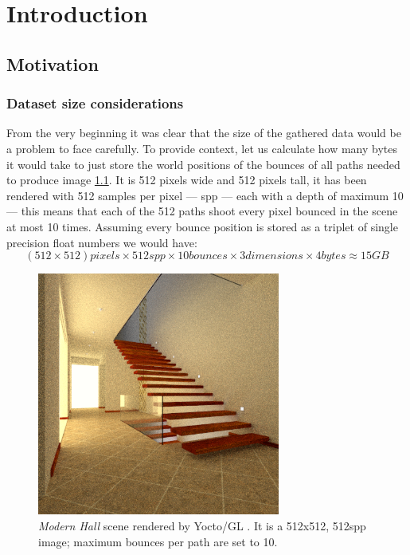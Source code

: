 \chapter{Introduction}

\section{Motivation}
\subsection{Dataset size considerations}
\label{size_considerations}
From the very beginning it was clear that the size of the gathered data would be a problem to face carefully. To provide context, let us calculate how many bytes it would take to just store the world positions of the bounces of all paths needed to produce image \ref{hall_render}. It is 512 pixels wide and 512 pixels tall, it has been rendered with 512 samples per pixel --- spp --- each with a depth of maximum 10 --- this means that each of the 512 paths shoot every pixel bounced in the scene at most 10 times. Assuming every bounce position is stored as a triplet of single precision float numbers we would have:
\begin{equation}
	\label{rough_bounce_size_estimation}
	(512 \times 512) pixels \times 512 spp \times 10 bounces \times 3 dimensions \times 4 bytes \approx 15GB
\end{equation}
\begin{figure}
	\centering
	\includegraphics[height=8cm]{chapters/chapter_thetool/hall}
	\caption{\textit{Modern Hall} scene \cite{bitterliscenes} rendered by Yocto/GL \cite{pellacini2019yocto}. It is a 512x512, 512spp image; maximum bounces per path are set to 10.}
	\label{hall_render}
\end{figure}
